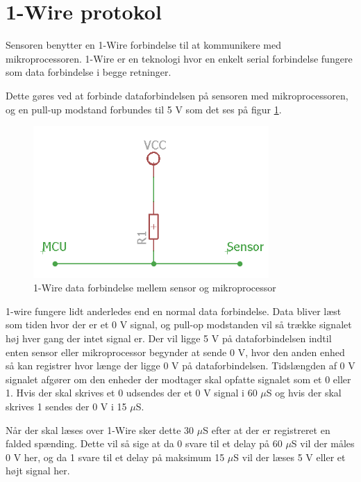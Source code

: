 \section{1-Wire protokol}
Sensoren benytter en 1-Wire forbindelse til at kommunikere med mikroprocessoren. 1-Wire er en teknologi hvor en  enkelt serial forbindelse fungere som data forbindelse i begge retninger. 

Dette gøres ved at forbinde dataforbindelsen på sensoren med mikroprocessoren, og en pull-up modstand forbundes til 5 V som det ses på figur \ref{one_wire_schematic}. 


\begin{figure}[h!]
  \centering
  \includegraphics[width=0.8\textwidth]{figures/onewire_eksempel.png}
  \caption{1-Wire data forbindelse mellem sensor og mikroprocessor}
  \label{one_wire_schematic}
\end{figure}

1-wire fungere lidt anderledes end en normal data forbindelse. Data bliver læst som tiden hvor der er et 0 V signal, og pull-op modstanden vil så trække signalet høj hver gang der intet signal er. Der vil ligge 5 V på dataforbindelsen indtil enten sensor eller mikroprocessor begynder at sende 0 V, hvor den anden enhed så kan registrer hvor længe der ligge 0 V på dataforbindelsen. Tidslængden af 0 V signalet afgører om den enheder der modtager skal opfatte signalet som et 0 eller 1. Hvis der skal skrives et 0 udsendes der et 0 V signal i 60 $\mu$S og hvis der skal skrives 1 sendes der 0 V i 15 $\mu$S. 

Når der skal læses over 1-Wire sker dette 30 $\mu$S efter at der er registreret en falded spænding. Dette vil så sige at da 0 svare til et delay på 60 $\mu$S vil der måles 0 V her, og da 1 svare til et delay på maksimum 15 $\mu$S vil der læses 5 V eller et højt signal her.


